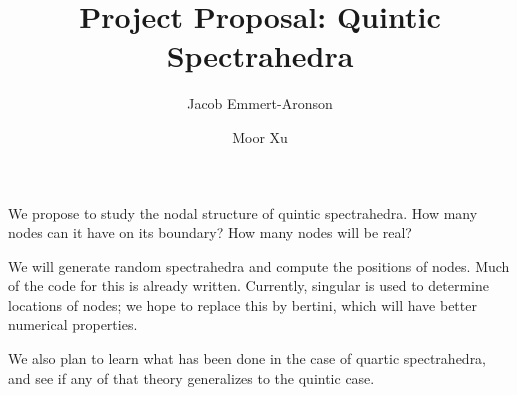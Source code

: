 \documentclass[12pt]{amsart}
\title{Project Proposal: Quintic Spectrahedra}
\author{Jacob Emmert-Aronson}
\author{Moor Xu}
\begin{document}
 
\maketitle

We propose to study the nodal structure of quintic spectrahedra. 
How many nodes can it have on its boundary? 
How many nodes will be real?

We will generate random spectrahedra and compute the positions of nodes. Much
of the code for this is already written. Currently, singular is used to
determine locations of nodes; we hope to replace this by bertini, which will
have better numerical properties.

We also plan to learn what has been done in the case of quartic spectrahedra,
and see if any of that theory generalizes to the quintic case.
\end{document}
